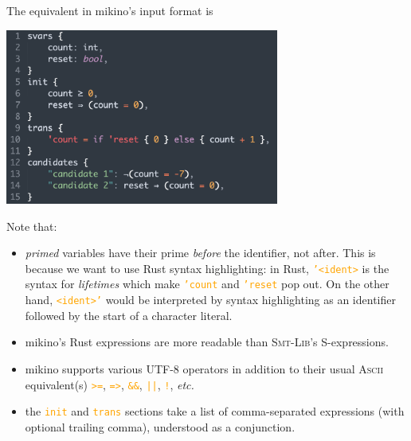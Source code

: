 \documentclass{easychair}
\newcommand{\mkn}{mikino}
\newcommand{\smt}{\textsc{Smt}}
\newcommand{\smtlib}{\smt{}-\textsc{Lib}}
\newcommand{\ita}[1]{\textit{#1}}
\newcommand{\code}[1]{\textcolor{orange}{\texttt{#1}}}
\newcommand{\picwidth}{9cm}
\newcommand{\init}{\code{init}}
\newcommand{\trans}{\code{trans}}
\begin{document}
The equivalent in \mkn{}'s input format is

\begin{center}
    \includegraphics[width=\picwidth]{../rsc/stopwatch_1.png}
\end{center}
%
Note that:
%
\begin{itemize}
    \item \ita{primed} variables have their prime \ita{before} the identifier, not after. This is
        because we want to use Rust syntax highlighting: in Rust, \code{'<ident>} is the syntax for
        \ita{lifetimes} which make \code{'count} and \code{'reset} pop out. On the other hand,
        \code{<ident>'} would be interpreted by syntax highlighting as an identifier followed by
        the start of a character literal.
    \item \mkn{}'s Rust expressions are more readable than \smtlib{}'s S-expressions.
    \item \mkn{} supports various \textsc{UTF}-8 operators in addition to their usual \textsc{Ascii}
        equivalent(s) \code{>=}, \code{=>}, \code{\&\&}, \code{||}, \code{!}, \ita{etc.}
    \item the \init{} and \trans{} sections take a list of comma-separated expressions (with
        optional trailing comma), understood as a conjunction.
\end{itemize}
\end{document}
